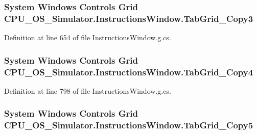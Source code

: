 \subsubsection[{Tab\+Grid\+\_\+\+Copy3}]{\setlength{\rightskip}{0pt plus 5cm}System Windows Controls Grid C\+P\+U\+\_\+\+O\+S\+\_\+\+Simulator.\+Instructions\+Window.\+Tab\+Grid\+\_\+\+Copy3\hspace{0.3cm}{\ttfamily [package]}}\label{class_c_p_u___o_s___simulator_1_1_instructions_window_a8a50487f6e6acca8a58ffe218e32abe2}


Definition at line 654 of file Instructions\+Window.\+g.\+cs.

\hypertarget{class_c_p_u___o_s___simulator_1_1_instructions_window_a33c64471b02aed8597462149051c2b51}{}
\subsubsection[{Tab\+Grid\+\_\+\+Copy4}]{\setlength{\rightskip}{0pt plus 5cm}System Windows Controls Grid C\+P\+U\+\_\+\+O\+S\+\_\+\+Simulator.\+Instructions\+Window.\+Tab\+Grid\+\_\+\+Copy4\hspace{0.3cm}{\ttfamily [package]}}\label{class_c_p_u___o_s___simulator_1_1_instructions_window_a33c64471b02aed8597462149051c2b51}


Definition at line 798 of file Instructions\+Window.\+g.\+cs.

\hypertarget{class_c_p_u___o_s___simulator_1_1_instructions_window_a495a21e0e96f26f87d3e379ab286256b}{}
\subsubsection[{Tab\+Grid\+\_\+\+Copy5}]{\setlength{\rightskip}{0pt plus 5cm}System Windows Controls Grid C\+P\+U\+\_\+\+O\+S\+\_\+\+Simulator.\+Instructions\+Window.\+Tab\+Grid\+\_\+\+Copy5\hspace{0.3cm}{\ttfamily [package]}}\label{class_c_p_u___o_s___simulator_1_1_instructions_window_a495a21e0e96f26f87d3e379ab286256b}


